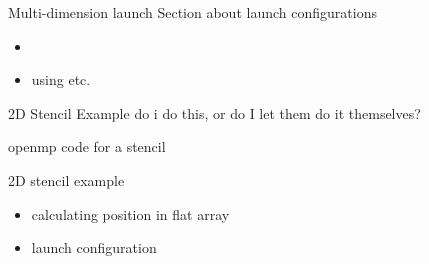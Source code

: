 
\begin{frame}[fragile]{}
    \begin{info}{Multi-dimension launch}
        Section about launch configurations
        \begin{itemize}
            \item {}
            \item using  etc.
        \end{itemize}
    \end{info}

\end{frame}

\begin{frame}[fragile]{2D Stencil Example}
    do i do this, or do I let them do it themselves?
    \begin{code}{openmp code for a stencil}
    \end{code}

\end{frame}

\begin{frame}[fragile]{}
    \begin{info}{2D stencil example}
        \begin{itemize}
            \item calculating position in flat array
            \item launch configuration
        \end{itemize}
    \end{info}

\end{frame}

